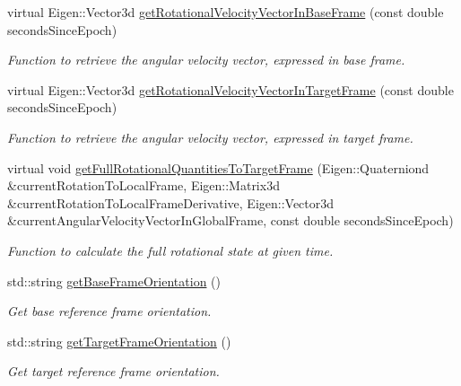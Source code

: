 \begin{DoxyCompactItemize}
\item 
virtual Eigen\+::\+Vector3d \hyperlink{classtudat_1_1ephemerides_1_1RotationalEphemeris_a88502baa383390473f016d197a42c5a3}{get\+Rotational\+Velocity\+Vector\+In\+Base\+Frame} (const double seconds\+Since\+Epoch)
\begin{DoxyCompactList}\small\item\em Function to retrieve the angular velocity vector, expressed in base frame. \end{DoxyCompactList}\item 
virtual Eigen\+::\+Vector3d \hyperlink{classtudat_1_1ephemerides_1_1RotationalEphemeris_a6119997ff42dca4a9ecb0b83229a8524}{get\+Rotational\+Velocity\+Vector\+In\+Target\+Frame} (const double seconds\+Since\+Epoch)
\begin{DoxyCompactList}\small\item\em Function to retrieve the angular velocity vector, expressed in target frame. \end{DoxyCompactList}\item 
virtual void \hyperlink{classtudat_1_1ephemerides_1_1RotationalEphemeris_af26529c506f7eed75689b57e70c29b64}{get\+Full\+Rotational\+Quantities\+To\+Target\+Frame} (Eigen\+::\+Quaterniond \&current\+Rotation\+To\+Local\+Frame, Eigen\+::\+Matrix3d \&current\+Rotation\+To\+Local\+Frame\+Derivative, Eigen\+::\+Vector3d \&current\+Angular\+Velocity\+Vector\+In\+Global\+Frame, const double seconds\+Since\+Epoch)
\begin{DoxyCompactList}\small\item\em Function to calculate the full rotational state at given time. \end{DoxyCompactList}\item 
std\+::string \hyperlink{classtudat_1_1ephemerides_1_1RotationalEphemeris_a8182a82115da3182001eaa703cf39520}{get\+Base\+Frame\+Orientation} ()
\begin{DoxyCompactList}\small\item\em Get base reference frame orientation. \end{DoxyCompactList}\item 
std\+::string \hyperlink{classtudat_1_1ephemerides_1_1RotationalEphemeris_a0a9beaf6621a5305b5b8ba50c4c4724a}{get\+Target\+Frame\+Orientation} ()
\begin{DoxyCompactList}\small\item\em Get target reference frame orientation. \end{DoxyCompactList}\end{DoxyCompactItemize}
